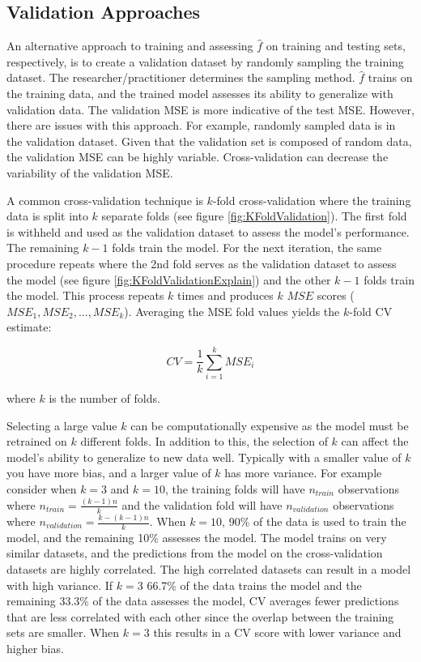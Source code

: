 \subsection{Validation Approaches} \label{sec:validationApproach}

An alternative approach to training and assessing \(\hat{f}\) on training and testing sets, respectively, is to create a validation dataset by randomly sampling the training dataset.  The researcher/practitioner determines the sampling method.  \(\hat{f}\) trains on the training data, and the trained model assesses its ability to generalize with validation data. The validation MSE is more indicative of the test MSE. However, there are issues with this approach. For example, randomly sampled data is in the validation dataset.  Given that the validation set is composed of random data, the validation MSE can be highly variable. Cross-validation can decrease the variability of the validation MSE.

A common cross-validation technique is \(k\)-fold cross-validation where the training data is split into \(k\) separate folds (see figure \ref{fig:KFoldValidation}). The first fold is withheld and used as the validation dataset to assess the model's performance. The remaining \(k-1\) folds train the model. For the next iteration, the same procedure repeats where the 2nd fold serves as the validation dataset to assess the model (see figure \ref{fig:KFoldValidationExplain}) and the other \(k-1\) folds train the model. This process repeats \(k\) times and  produces \(k\) \(MSE\) scores (\(MSE_1, MSE_2, ... , MSE_k\)). Averaging the MSE fold values yields the \(k\)-fold CV estimate:

\begin{equation}
\label{eq:CV}
CV = \frac{1}{k} \sum_{i=1}^k MSE_i
\end{equation}

\noindent where \(k\) is the number of folds. 

Selecting a large value \(k\) can be computationally expensive as the model must be retrained on \(k\) different folds. In addition to this, the selection of \(k\) can affect the model's ability to generalize to new data well. Typically with a smaller value of \(k\) you have more bias, and a larger value of \(k\) has more variance. For example consider when \(k=3\) and \(k=10\), the training folds will have \(n_{train}\) observations where  \( n_{train}= \frac{(k-1)n}{k}\) and the validation fold will have \(n_{validation}\) observations where \( n_{validation}= \frac{k-(k-1)n}{k}\). When \(k=10\), 90\% of the data is used to train the model, and the remaining 10\% assesses the model. The model trains on very similar datasets, and the predictions from the model on the cross-validation datasets are highly correlated. The high correlated datasets can result in a model with high variance. If \(k=3\) 66.7\% of the data trains the model and the remaining 33.3\% of the data assesses the model, CV averages fewer predictions that are less correlated with each other since the overlap between the training sets are smaller. When \(k=3\) this results in a CV score with lower variance and higher bias. 

